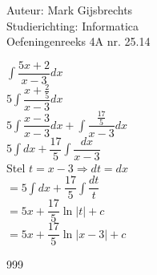 \documentclass[a4paper]{article}
\newcommand{\dint}{\displaystyle\int}
\begin{document}
\noindent \large Auteur: Mark Gijsbrechts \\
\noindent \large Studierichting: Informatica\\
\noindent \large Oefeningenreeks 4A nr. 25.14\\

\medskip

\normalsize





$\dint \dfrac{5x+2}{x-3} dx $ \\

$5\dint \dfrac{x+\tfrac{2}{5}}{x-3} dx $ \\

$5\dint \dfrac{x-3}{x-3} dx + \dint \dfrac{\tfrac{17}{5}}{x-3} dx $ \\

$5\dint dx + \dfrac{17}{5}\dint \dfrac{dx}{x-3} $ \\

Stel $ t = x - 3 \Rightarrow dt = dx $ \\

$= 5\dint dx + \dfrac{17}{5} \dint \dfrac{dt}{t} $ \\

$= 5x + \dfrac{17}{5}\ln|t| + c $ \\

$= 5x + \dfrac{17}{5}\ln|x-3| + c $ \\



\begin{thebibliography}{999}
\end{thebibliography}
\end{document}
